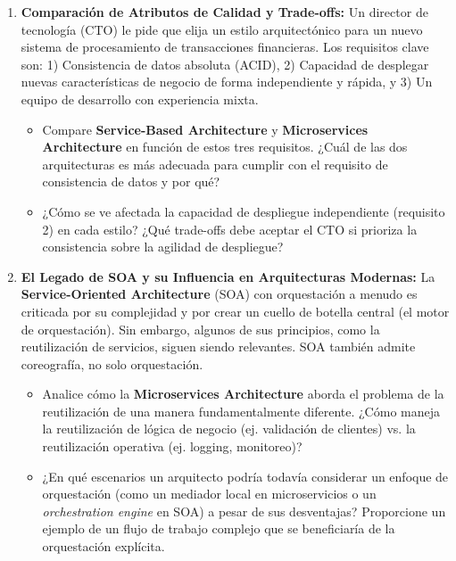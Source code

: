 \documentclass[12pt,a4paper]{article}
\begin{document}
\begin{enumerate}[label=\textbf{\arabic*.}, leftmargin=*, itemsep=1.2em]
  \item \textbf{Comparación de Atributos de Calidad y Trade-offs:}
  Un director de tecnología (CTO) le pide que elija un estilo arquitectónico para un nuevo sistema de procesamiento de transacciones financieras. Los requisitos clave son: 1) Consistencia de datos absoluta (ACID), 2) Capacidad de desplegar nuevas características de negocio de forma independiente y rápida, y 3) Un equipo de desarrollo con experiencia mixta.
  \begin{itemize}[leftmargin=1.5em]
    \item Compare \textbf{Service-Based Architecture} y \textbf{Microservices Architecture} en función de estos tres requisitos. ¿Cuál de las dos arquitecturas es más adecuada para cumplir con el requisito de consistencia de datos y por qué?
    \item ¿Cómo se ve afectada la capacidad de despliegue independiente (requisito 2) en cada estilo? ¿Qué trade-offs debe aceptar el CTO si prioriza la consistencia sobre la agilidad de despliegue?
  \end{itemize}

  \item \textbf{El Legado de SOA y su Influencia en Arquitecturas Modernas:}
  La \textbf{Service-Oriented Architecture} (SOA) con orquestación a menudo es criticada por su complejidad y por crear un cuello de botella central (el motor de orquestación). Sin embargo, algunos de sus principios, como la reutilización de servicios, siguen siendo relevantes. SOA también admite coreografía, no solo orquestación.
  \begin{itemize}[leftmargin=1.5em]
    \item Analice cómo la \textbf{Microservices Architecture} aborda el problema de la reutilización de una manera fundamentalmente diferente. ¿Cómo maneja la reutilización de lógica de negocio (ej. validación de clientes) vs. la reutilización operativa (ej. logging, monitoreo)?
    \item ¿En qué escenarios un arquitecto podría todavía considerar un enfoque de orquestación (como un mediador local en microservicios o un \emph{orchestration engine} en SOA) a pesar de sus desventajas? Proporcione un ejemplo de un flujo de trabajo complejo que se beneficiaría de la orquestación explícita.
  \end{itemize}

\end{enumerate}

\newpage
\end{document}
